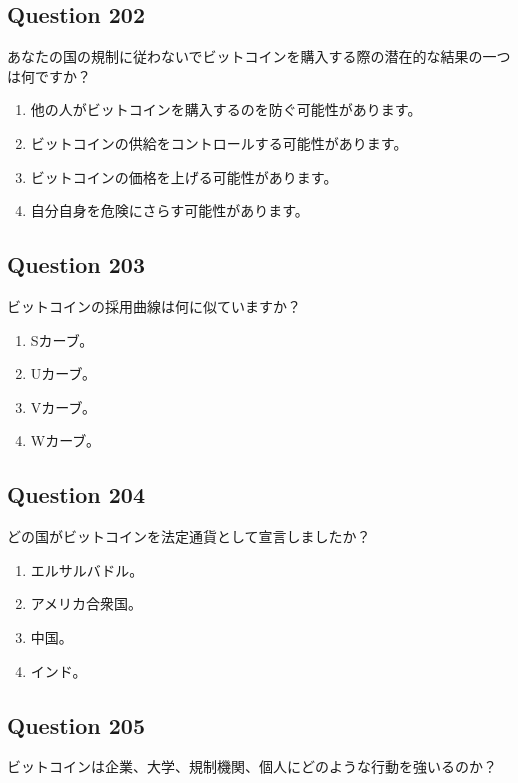 \documentclass[12pt,a4paper]{article}
\begin{document}
\bigskip


\subsection*{Question 202}
あなたの国の規制に従わないでビットコインを購入する際の潜在的な結果の一つは何ですか？

\begin{enumerate}[label=\Alph*., leftmargin=*]
\item 他の人がビットコインを購入するのを防ぐ可能性があります。
\item ビットコインの供給をコントロールする可能性があります。
\item ビットコインの価格を上げる可能性があります。
\item 自分自身を危険にさらす可能性があります。
\end{enumerate}

\bigskip


\subsection*{Question 203}
ビットコインの採用曲線は何に似ていますか？

\begin{enumerate}[label=\Alph*., leftmargin=*]
\item Sカーブ。
\item Uカーブ。
\item Vカーブ。
\item Wカーブ。
\end{enumerate}

\bigskip


\subsection*{Question 204}
どの国がビットコインを法定通貨として宣言しましたか？

\begin{enumerate}[label=\Alph*., leftmargin=*]
\item エルサルバドル。
\item アメリカ合衆国。
\item 中国。
\item インド。
\end{enumerate}

\bigskip


\subsection*{Question 205}
ビットコインは企業、大学、規制機関、個人にどのような行動を強いるのか？
\end{document}
